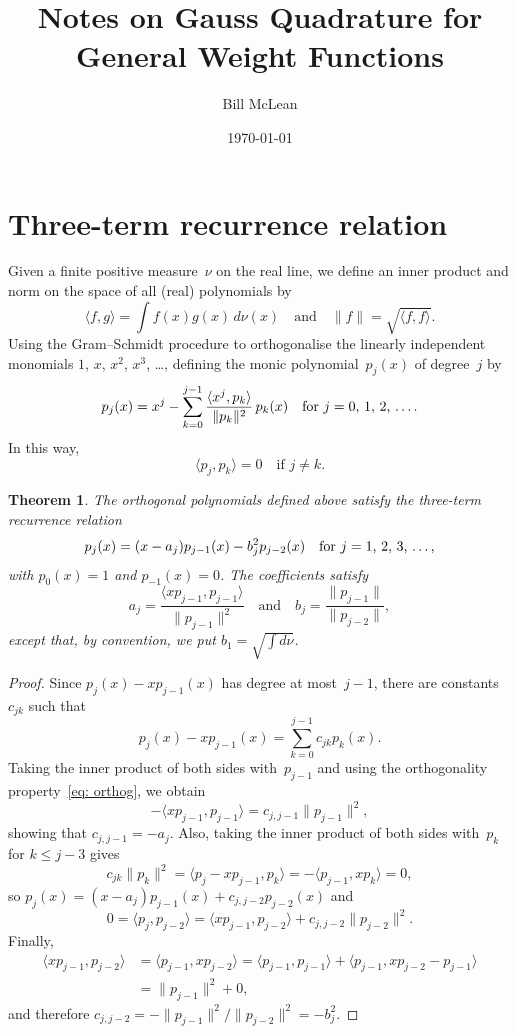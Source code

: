 \documentclass[12pt,a4paper]{article}
\title{Notes on Gauss Quadrature for General Weight Functions}
\author{Bill McLean}
\date{\today}
\newtheorem{theorem}{Theorem}
\newcommand{\iprod}[1]{\langle#1\rangle}
\begin{document}
\maketitle
\section{Three-term recurrence relation}
Given a finite positive measure~$\nu$ on the real line, we define 
an inner product and norm on the space of all (real) polynomials by
\[
\iprod{f,g}=\int f(x)g(x)\,d\nu(x)\quad\text{and}\quad
\|f\|=\sqrt{\iprod{f,f}}.
\]
Using the Gram--Schmidt procedure to orthogonalise the linearly 
independent monomials $1$, $x$, $x^2$, $x^3$, \dots, defining the 
monic polynomial~$p_j(x)$ of degree~$j$ by
\[
p_j(x)=x^j-\sum_{k=0}^{j-1}\frac{\iprod{x^j,p_k}}{\|p_k\|^2}\,p_k(x)
	\quad\text{for $j=0$, $1$, $2$, \dots.}
\]
In this way,
\begin{equation}\label{eq: orthog}
\iprod{p_j,p_k}=0\quad\text{if $j\ne k$.}
\end{equation}

\begin{theorem}\label{thm: 3 term}
The orthogonal polynomials defined above satisfy the three-term 
recurrence relation
\[
p_j(x)=(x-a_j)p_{j-1}(x)-b_j^2p_{j-2}(x)
	\quad\text{for $j=1$, $2$, $3$, \dots,}
\]
with $p_0(x)=1$ and $p_{-1}(x)=0$. The coefficients satisfy
\[
a_j=\frac{\iprod{xp_{j-1},p_{j-1}}}{\|p_{j-1}\|^2}
\quad\text{and}\quad
b_j=\frac{\|p_{j-1}\|}{\|p_{j-2}\|},
\]
except that, by convention, we put $b_1=\sqrt{\int d\nu}$.
\end{theorem}
\begin{proof}
Since $p_j(x)-xp_{j-1}(x)$ has degree at most~$j-1$, there are 
constants~$c_{jk}$ such that
\[
p_j(x)-xp_{j-1}(x)=\sum_{k=0}^{j-1}c_{jk}p_k(x).
\]
Taking the inner product of both sides with~$p_{j-1}$ and using
the orthogonality property~\eqref{eq: orthog}, we obtain
\[
-\iprod{xp_{j-1},p_{j-1}}=c_{j,j-1}\|p_{j-1}\|^2,
\]
showing that $c_{j,j-1}=-a_j$.  Also, taking the inner product of both
sides with~$p_k$ for $k\le j-3$ gives
\[
c_{jk}\|p_k\|^2=\iprod{p_j-xp_{j-1},p_k}=-\iprod{p_{j-1},xp_k}=0,
\]
so $p_j(x)=(x-a_j)p_{j-1}(x)+c_{j,j-2}p_{j-2}(x)$ and
\[
0=\iprod{p_j,p_{j-2}}=\iprod{xp_{j-1},p_{j-2}}+c_{j,j-2}\|p_{j-2}\|^2.
\]
Finally, 
\begin{align*}
\iprod{xp_{j-1},p_{j-2}}&=\iprod{p_{j-1},xp_{j-2}}
	=\iprod{p_{j-1},p_{j-1}}+\iprod{p_{j-1},xp_{j-2}-p_{j-1}}\\
	&=\|p_{j-1}\|^2+0,
\end{align*}
and therefore $c_{j,j-2}=-\|p_{j-1}\|^2/\|p_{j-2}\|^2=-b_j^2$.
\end{proof}
\end{document}
